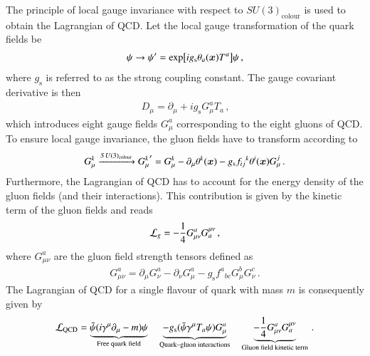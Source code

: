 The principle of local gauge invariance with respect to $SU(3)_{\text{colour}}$
is used to obtain the Lagrangian of QCD. Let the local gauge transformation of
the quark fields be
\begin{align*}
  \psi \to \psi^\prime = \exp[ i g_{\text{s}} \theta_a(\bm{x}) T^a] \psi \,\text{,}
\end{align*}
where $g_{\text{s}}$ is referred to as the strong coupling constant. The gauge
covariant derivative is then
\begin{align*}
  D_\mu = \partial_\mu + i g_{\text{s}} G_\mu^a T_a \,\text{,}
\end{align*}
which introduces eight gauge fields $G_\mu^a$ corresponding to the eight gluons
of QCD. To ensure local gauge invariance, the gluon fields have to transform
according to
\begin{align*}
  G_\mu^k \xrightarrow{SU(3)_{\text{colour}}} {G_\mu^k}^\prime = G_\mu^k  - \partial_\mu \theta^k(\bm{x}) - g_{\text{s}} {f_{ij}}^k \theta^i(\bm{x}) G_\mu^j \,\text{.}
\end{align*}
Furthermore, the Lagrangian of QCD has to account for the energy density of the
gluon fields (and their interactions). This contribution is given by the kinetic
term of the gluon fields and reads
\begin{align*}
  \mathcal{L}_{g} = - \frac{1}{4} G_{\mu\nu}^{a} G^{\mu\nu}_{a} \,\text{,}
\end{align*}
where $G_{\mu\nu}^a$ are the gluon field strength tensors defined as
\begin{align*}
  G_{\mu\nu}^a = \partial_\mu G_\nu^a - \partial_\nu G_\mu^a - g_{\text{s}} {f^{a}}_{bc} G_\mu^b G_\nu ^c \,\text{.}
\end{align*}
The Lagrangian of QCD for a single flavour of quark with mass $m$ is
consequently given by
\begin{align*}
  \mathcal{L}_{\text{QCD}} =
  \underbrace{\bar{\psi} (i \gamma^\mu \partial_\mu - m) \psi}_{\text{Free quark field}}
  \hspace*{1em}
  \underbrace{- g_{\text{s}} (\bar{\psi} \gamma^\mu T_a \psi) G_\mu^a}_{\text{Quark--gluon interactions}}
  \hspace*{1em}
  \underbrace{- \frac{1}{4} G_{\mu\nu}^a G^{\mu\nu}_a}_{\text{Gluon field kinetic term}} \,\text{.}
\end{align*}
